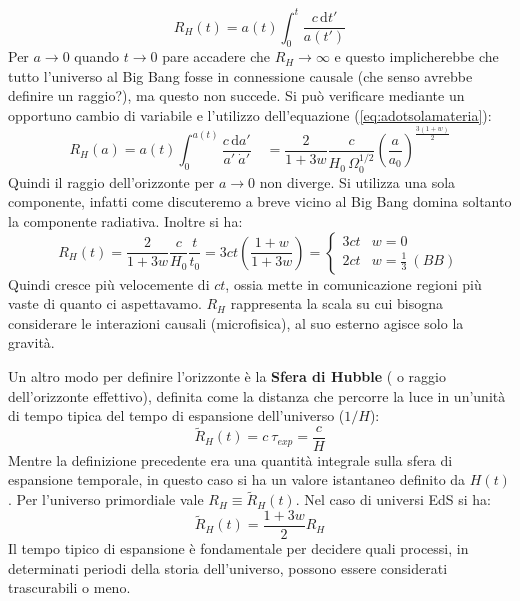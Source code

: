 \begin{equation}
    R_H (t) = a(t) \int_0^t \frac{c\, \mathrm{d}t'}{a(t')}
\end{equation}
Per $a \rightarrow 0$ quando $ t \rightarrow 0$ pare accadere che $R_H \rightarrow \infty$ e questo implicherebbe che tutto l'universo al Big Bang fosse in connessione causale (che senso avrebbe definire un raggio?), ma questo non succede. Si può verificare mediante un opportuno cambio di variabile e l'utilizzo dell'equazione (\ref{eq:adotsolamateria}):
\begin{equation*}
    R_H (a) = a(t) \int_0^{a(t)} \frac{c\, \mathrm{d}a'}{a' \: \dot{a}'} \quad = \frac{2}{1+3w} \frac{c}{H_0\, \Omega_0^{1/2}} \left ( \frac{a}{a_0} \right)^{\frac{3(1+w)}{2}}
\end{equation*}
Quindi il raggio dell'orizzonte per $a \rightarrow 0$ non diverge. Si utilizza una sola componente, infatti come discuteremo a breve vicino al Big Bang domina soltanto la componente radiativa. Inoltre si ha:
\begin{equation}
    R_H (t) = \frac{2}{1+3w}\frac{c}{H_0}\frac{t}{t_0} = 3ct \left ( \frac{1+w}{ 1+3w} \right )= \left\{\begin{matrix}
3ct & w=0\\ 
2ct & w=\frac{1}{3}\: (BB)
\end{matrix}\right.
\end{equation}
Quindi cresce più velocemente di $ct$, ossia mette in comunicazione regioni più vaste di quanto ci aspettavamo. $R_H$ rappresenta la scala su cui bisogna considerare le interazioni causali (microfisica), al suo esterno agisce solo la gravità.

Un altro modo per definire l'orizzonte è la \textbf{Sfera di Hubble} ( o raggio dell'orizzonte effettivo), definita come la distanza che percorre la luce in un'unità di tempo tipica del tempo di espansione dell'universo ($1/H$): 
\begin{equation}
    \tilde{R}_H (t) = c\: \tau_{exp} = \frac{c}{H}
\end{equation}
Mentre la definizione precedente era una quantità integrale sulla sfera di espansione temporale, in questo caso si ha un valore istantaneo definito da $H(t)$. Per l'universo primordiale vale $R_H \equiv \tilde{R}_H (t)$. Nel caso di universi EdS si ha:
\begin{equation*}
    \tilde{R}_H (t) =  \frac{1+3w}{2} R_H
\end{equation*}
Il tempo tipico di espansione è fondamentale per decidere quali processi, in determinati periodi della storia dell'universo, possono essere considerati trascurabili o meno.

